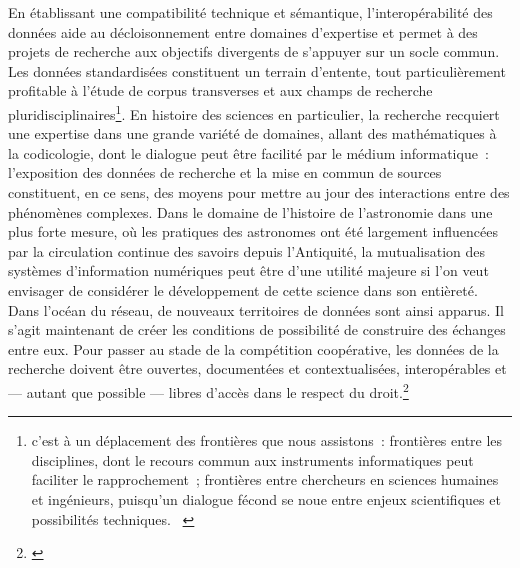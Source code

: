 \documentclass[a4paper,12pt,twoside]{book}
\let\quoteOld\quote
\let\endquoteOld\endquote
\renewenvironment{quote}{\small\quoteOld}{\endquoteOld}
\newcommand{\p}{[\ldots]\xspace}
\newcommand{\g}[1]{\og#1~\fg}
\begin{document}
En établissant une compatibilité technique et sémantique, l'interopérabilité des données aide au décloisonnement entre domaines d'expertise et permet à des projets de recherche aux objectifs divergents de s'appuyer sur un socle commun. Les données standardisées constituent un terrain d'entente, tout particulièrement profitable à l'étude de corpus transverses et aux champs de recherche pluridisciplinaires\footnote{\g{\p c’est à un déplacement des frontières que nous assistons~: frontières entre les disciplines, dont le recours commun aux instruments informatiques peut faciliter le rapprochement~; frontières entre chercheurs en sciences humaines et ingénieurs, puisqu’un dialogue fécond se noue entre enjeux scientifiques et possibilités techniques.} \cite[p.~3]{dacosEtatLieuxPositionnement2013}}. En histoire des sciences en particulier, la recherche recquiert une expertise dans une grande variété de domaines, allant des mathématiques à la codicologie, dont le dialogue peut être facilité par le médium informatique~: l'exposition des données de recherche et la mise en commun de sources constituent, en ce sens, des moyens pour mettre au jour des interactions entre des phénomènes complexes. Dans le domaine de l'histoire de l'astronomie dans une plus forte mesure, où les pratiques des astronomes ont été largement influencées par la circulation continue des savoirs depuis l'Antiquité, la mutualisation des systèmes d'information numériques peut être d'une utilité majeure si l'on veut envisager de considérer le développement de cette science dans son entièreté.\\

\begin{quote}
	Dans l’océan du réseau, de nouveaux territoires de données sont ainsi apparus. Il s’agit maintenant de créer les conditions  de  possibilité  de  construire  des  échanges  entre  eux.  Pour  passer  au  stade  de  la  compétition  coopérative,  les  données  de  la  recherche  doivent  être  ouvertes,  documentées et contextualisées, interopérables et — autant que possible — libres d’accès dans le respect du droit.\footnote{\cite{rennevilleHumaNumNouvelleTres2013}}\\
\end{quote}
\end{document}
